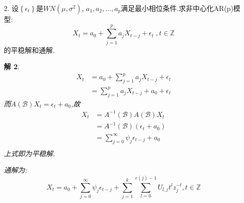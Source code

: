 \documentclass[11pt,a4paper]{ctexart}
\newtheorem*{solution}{解}
\begin{document}
\begin{enumerate}
\begin{solution}
当$ k\geq 1 $时,$ \psi_k=\frac{1}{6}(\psi_{k-1}+\psi_{k-2}) $,解该差分方程得
\begin{equation}
\psi_k=\frac{3}{5}(\frac{1}{2})^k+\frac{2}{5}(\frac{-1}{3})^k 
\end{equation}
故平稳解为:
\begin{equation}
	X_t=\sum_{j=0}^{\infty}\left[ \frac{3}{5}(\frac{1}{2})^j+\frac{2}{5}(\frac{-1}{3})^j \right] \epsilon_{t-j}
\end{equation}
自协方差函数$ \gamma_k $为:
\begin{equation}
\begin{aligned}
\gamma_k &= \sigma^2\sum_{j=1}^{\infty} \psi_j\psi_{j+k}\\
&= 0.25\sum_{j=1}^{\infty} \left[ \frac{3}{5}(\frac{1}{2})^j+\frac{2}{5}(\frac{-1}{3})^j \right]\left[ \frac{3}{5}(\frac{1}{2})^{j+k}+\frac{2}{5}(\frac{-1}{3})^{j+k} \right]\\
&= \frac{1}{100}\left[ 3(\frac{1}{2})^{k-2}+\frac{4}{7}(\frac{-1}{3})^{k-2}+\frac{9}{7}(\frac{1}{2})^{k-2}+2(\frac{-1}{3})^{k-2}\right] 
\end{aligned}
\end{equation}
\end{solution}
\item[2.]设$ \left\lbrace \epsilon_t \right\rbrace  $是$ WN(\mu,\sigma^2) $, $ a_1,a_2,...,a_p $满足最小相位条件.求非中心化AR(p)模型:
\begin{equation}
X_t=a_0+\sum_{j=1}^{p}a_jX_{t-j}+\epsilon_t\;,t\in\mathbb{Z}
\end{equation}
的平稳解和通解.
\begin{solution}
\begin{equation}
\begin{aligned}
X_t &= a_0+\sum_{j=1}^{p}a_jX_{t-j}+\epsilon_t\\
&= \sum_{j=1}^{p}a_jX_{t-j}+a_0+\epsilon_t
\end{aligned}
\end{equation}
而$ 	A(\mathcal{B})X_t=\epsilon_t+a_0 $,故
\begin{equation}
\begin{aligned}
X_t &= A^{-1}(\mathcal{B})A(\mathcal{B})X_t\\
&= A^{-1}(\mathcal{B})(\epsilon_t+a_0)\\
&= \sum_{j=0}^{\infty}\psi_j\epsilon_{t-j}+a_0\\
\end{aligned}
\end{equation}
上式即为平稳解.

通解为:
\begin{equation}
	X_t=a_0+\sum_{j=0}^{\infty}\psi_j\epsilon_{t-j}+\sum_{j=1}^{k}\sum_{l=0}^{r(j)-1}U_{l,j}t^lz_j^{-t},t\in\mathbb{Z}
\end{equation}
\end{solution}

\end{enumerate}
\end{document}
